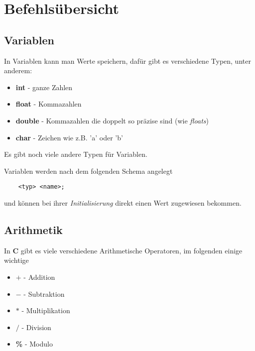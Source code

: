 \documentclass[c_worksheet.tex]{subfiles}
\begin{document}
	
\chapter{Befehlsübersicht} 

\section{Variablen}

In Variablen kann man Werte speichern, dafür gibt es verschiedene Typen, unter anderem:

\begin{itemize}
 	\item \textbf{int} - ganze Zahlen
 	\item \textbf{float} - Kommazahlen
 	\item \textbf{double} - Kommazahlen die doppelt so präzise sind (wie \emph{floats})
 	\item \textbf{char} - Zeichen wie z.B. 'a' oder 'b' 
 \end{itemize} 

Es gibt noch viele andere Typen für Variablen.

Variablen werden nach dem folgenden Schema angelegt

\begin{lstlisting}
	<typ> <name>;
\end{lstlisting}

und können bei ihrer \emph{Initialisierung} direkt einen Wert zugewiesen bekommen.

 



\section{Arithmetik}

In \textbf{C} gibt es viele verschiedene Arithmetische Operatoren, im folgenden einige wichtige

\begin{itemize}
 	\item \textbf{\(+\)} - Addition
 	\item \textbf{\(-\)} - Subtraktion
 	\item \textbf{\(*\)} - Multiplikation
 	\item \textbf{\(/\)} - Division
 	\item \textbf{\%} - Modulo   
 \end{itemize} 
\end{document}
